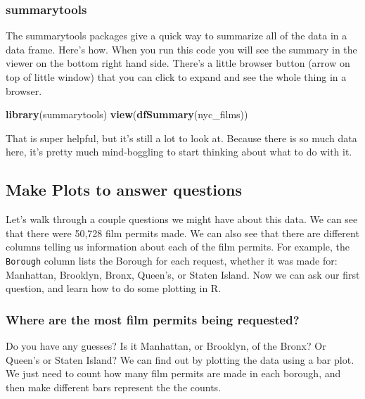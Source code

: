\documentclass[]{book}
\newenvironment{Shaded}{\begin{snugshade}}{\end{snugshade}}
\newcommand{\KeywordTok}[1]{\textcolor[rgb]{0.13,0.29,0.53}{\textbf{#1}}}
\newcommand{\NormalTok}[1]{#1}
\begin{document}
\subsubsection{summarytools}\label{summarytools}

The summarytools packages give a quick way to summarize all of the data
in a data frame. Here's how. When you run this code you will see the
summary in the viewer on the bottom right hand side. There's a little
browser button (arrow on top of little window) that you can click to
expand and see the whole thing in a browser.

\begin{Shaded}
\begin{Highlighting}[]
\KeywordTok{library}\NormalTok{(summarytools)}
\KeywordTok{view}\NormalTok{(}\KeywordTok{dfSummary}\NormalTok{(nyc_films))}
\end{Highlighting}
\end{Shaded}

That is super helpful, but it's still a lot to look at. Because there is
so much data here, it's pretty much mind-boggling to start thinking
about what to do with it.

\subsection{Make Plots to answer
questions}\label{make-plots-to-answer-questions}

Let's walk through a couple questions we might have about this data. We
can see that there were 50,728 film permits made. We can also see that
there are different columns telling us information about each of the
film permits. For example, the \texttt{Borough} column lists the Borough
for each request, whether it was made for: Manhattan, Brooklyn, Bronx,
Queen's, or Staten Island. Now we can ask our first question, and learn
how to do some plotting in R.

\subsubsection{Where are the most film permits being
requested?}\label{where-are-the-most-film-permits-being-requested}

Do you have any guesses? Is it Manhattan, or Brooklyn, of the Bronx? Or
Queen's or Staten Island? We can find out by plotting the data using a
bar plot. We just need to count how many film permits are made in each
borough, and then make different bars represent the the counts.
\end{document}
